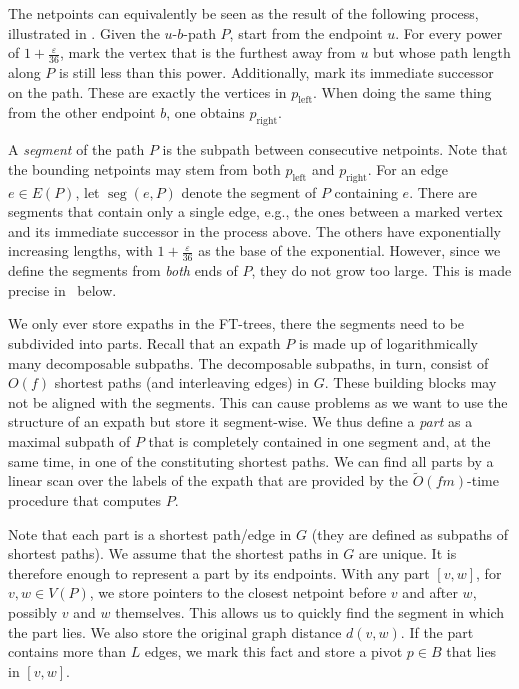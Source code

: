 \documentclass{theoretics}
\DeclareMathOperator{\seg}{seg}
\newcommand*{\Otilde}{\widetilde{O}}
\newcommand{\eps}{\varepsilon}
\begin{document}
The netpoints can equivalently be seen as the result of the following process, 
illustrated in .
Given the $u$-$b$-path $P$, start from the endpoint $u$.
For every power of $1+\tfrac{\eps}{36}$, 
mark the vertex that is the furthest away from $u$ but whose path length along $P$
is still less than this power.
Additionally, mark its immediate successor on the path.
These are exactly the vertices in $p_{\text{left}}$.
When doing the same thing from the other endpoint $b$, one obtains $p_{\text{right}}$.

A \emph{segment} of the path $P$ is the subpath between consecutive netpoints.
Note that the bounding netpoints may stem from both $p_{\text{left}}$ and $p_{\text{right}}$.
For an edge $e \in E(P)$, let $\seg(e,P)$ denote the segment of $P$ containing $e$.
There are segments that contain only a single edge,
e.g., the ones between a marked vertex and its immediate successor in the process above.
The others have exponentially increasing lengths,
with $1+ \tfrac{\eps}{36}$ as the base of the exponential.
However, since we define the segments from \emph{both} ends of $P$, they do not grow too large.
This is made precise in~ below.

We only ever store expaths in the FT-trees,
there the segments need to be subdivided into parts.
Recall that an expath $P$ is made up of logarithmically many decomposable subpaths.
The decomposable subpaths, in turn, consist of $O(f)$ shortest paths (and interleaving edges) in $G$.
These building blocks may not be aligned with the segments.
This can cause problems as we want to use the structure of an expath but store it segment-wise.
We thus define a \emph{part} as a maximal subpath of $P$
that is completely contained in one segment 
and, at the same time, in one of the constituting shortest paths.
We can find all parts by a linear scan over the labels of the expath
that are provided by the $\Otilde(fm)$-time procedure that computes $P$.

Note that each part is a shortest path/edge in $G$
(they are defined as subpaths of shortest paths).
We assume that the shortest paths  in $G$ are unique.
It is therefore enough to represent a part by its endpoints.
With any part $[v,w]$, for $v,w \in V(P)$,
we store pointers to the closest netpoint before $v$ and after $w$,
possibly $v$ and $w$ themselves.
This allows us to quickly find the segment in which the part lies.
We also store the original graph distance $d(v,w)$.
If the part contains more than $L$ edges,
we mark this fact and store a pivot $p \in B$ that lies in $[v,w]$.
\end{document}
